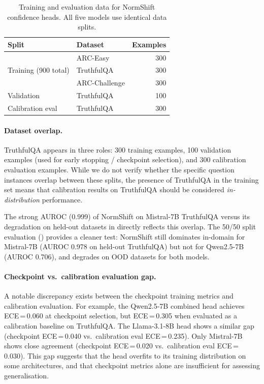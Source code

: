 \documentclass[11pt,a4paper]{article}
\begin{document}
\begin{table}[H]
\centering
\caption{Training and evaluation data for NormShift confidence heads.
         All five models use identical data splits.}
\label{tab:data-composition}
\begin{tabular}{@{}llr@{}}
\toprule
Split & Dataset & Examples \\
\midrule
\multirow{3}{*}{Training (900 total)}
  & ARC-Easy       & 300 \\
  & TruthfulQA     & 300 \\
  & ARC-Challenge  & 300 \\
\midrule
Validation        & TruthfulQA & 100 \\
\midrule
Calibration eval  & TruthfulQA & 300 \\
\bottomrule
\end{tabular}
\end{table}

\paragraph{Dataset overlap.}
TruthfulQA appears in three roles: 300 training examples, 100 validation
examples (used for early stopping / checkpoint selection), and 300
calibration evaluation examples.  While we do not verify whether the
specific question instances overlap between these splits, the presence of
TruthfulQA in the training set means that calibration results on
TruthfulQA should be considered \emph{in-distribution} performance.

The strong AUROC (0.999) of NormShift on Mistral-7B TruthfulQA versus
its degradation on held-out datasets in 
directly reflects this overlap.  The 50/50 split evaluation
()
provides a cleaner test: NormShift still dominates in-domain for
Mistral-7B (AUROC 0.978 on held-out TruthfulQA) but not for Qwen2.5-7B
(AUROC 0.706), and degrades on OOD datasets for both models.

\paragraph{Checkpoint vs.\ calibration evaluation gap.}
A notable discrepancy exists between the checkpoint training metrics
and calibration evaluation.  For example, the Qwen2.5-7B combined head
achieves ECE\,=\,0.060 at checkpoint selection, but ECE\,=\,0.305 when
evaluated as a calibration baseline on TruthfulQA.  The Llama-3.1-8B
head shows a similar gap (checkpoint ECE\,=\,0.040 vs.\ calibration
eval ECE\,=\,0.235).  Only Mistral-7B shows close agreement (checkpoint
ECE\,=\,0.020 vs.\ calibration eval ECE\,=\,0.030).  This gap suggests
that the head overfits to its training distribution on some
architectures, and that checkpoint metrics alone are insufficient for
assessing generalisation.
\end{document}
